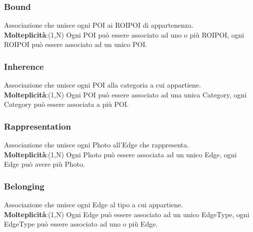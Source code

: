 \documentclass[../ManualeSviluppatore.tex]{subfiles}
\begin{document}
		\subsubsection{Bound}
			Associazione che unisce ogni POI ai ROIPOI di appartenenza. \\
			\textbf{Molteplicità}:(1,N) Ogni POI può essere associato ad uno o più ROIPOI, ogni ROIPOI può essere associato ad un unico POI.

		\subsubsection{Inherence}
			Associazione che unisce ogni POI alla categoria a cui appartiene.\\
			\textbf{Molteplicità}:(1,N) Ogni POI può essere associato ad una unica Category, ogni Category può essere associata a più POI.

		\subsubsection{Rappresentation}
			Associazione che unisce ogni Photo all'Edge che rappresenta. \\
			\textbf{Molteplicità}:(1,N) Ogni Photo può essere associata ad un unico Edge, ogni Edge può avere più Photo.

		\subsubsection{Belonging}
			Associazione che unisce ogni Edge al tipo a cui appartiene.\\
			\textbf{Molteplicità}:(1,N) Ogni Edge può essere associato ad un unico EdgeType, ogni EdgeType può essere associato ad uno o più Edge.
\end{document}
